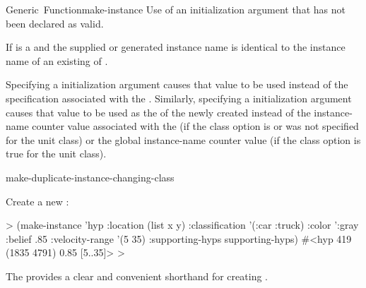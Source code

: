 \documentclass[10pt,twoside,english,pdftex]{article}
\begin{document}
\begin{functiondoc}{Generic~Function}{make-instance}{
     
     
    \returns{} }
\fnerrors
Use of an initialization argument that has not been declared as valid.

If  is a  and the supplied or generated
instance name is identical to the instance name of an existing
 of .

%
%
%
%
%
\fndescription 
%
Specifying a  initialization argument causes
that value to be used instead of the 
specification associated with the . Similarly, specifying a
 initialization argument causes that value to be
used as the  of the newly created 
instead of the instance-name counter value associated with the
 (if the 
class option is \nil{} or was not specified for the unit class) or the global
instance-name counter value (if the
 class option is true for the
unit class).

\begin{alsos}{make-duplicate-instance-changing-class}
\end{alsos}

\fnexample
Create a new  :
%
\W\supp
\begin{example}
  > (make-instance 'hyp 
       :location (list x y)
       :classification '(:car :truck)
       :color ':gray
       :belief .85
       :velocity-range '(5 35)
       :supporting-hyps supporting-hyps)
  #<hyp 419 (1835 4791) 0.85 [5..35]>
  >
\end{example}

\fnnote {}%
The  
provides a clear and convenient shorthand for creating
.

\end{functiondoc}

\end{document}
